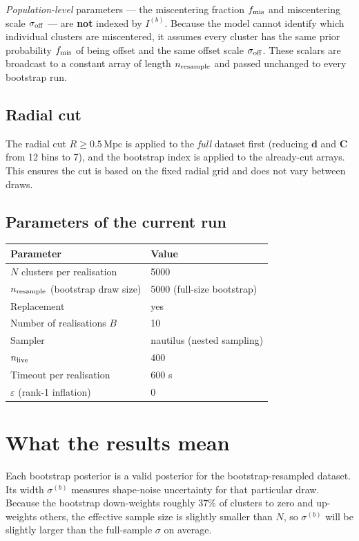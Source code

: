 \documentclass[11pt,a4paper]{article}
\begin{document}
\emph{Population-level} parameters — the miscentering fraction $f_{\rm mis}$
and miscentering scale $\sigma_{\rm off}$ — are \textbf{not} indexed by
$I^{(b)}$.  Because the model cannot identify which individual clusters are
miscentered, it assumes every cluster has the same prior probability
$f_{\rm mis}$ of being offset and the same offset scale $\sigma_{\rm off}$.
These scalars are broadcast to a constant array of length $n_{\rm resample}$
and passed unchanged to every bootstrap run.

\subsection{Radial cut}

The radial cut $R \geq 0.5\,\mathrm{Mpc}$ is applied to the \emph{full}
dataset first (reducing $\mathbf{d}$ and $\mathbf{C}$ from 12 bins to 7),
and the bootstrap index is applied to the already-cut arrays.  This ensures
the cut is based on the fixed radial grid and does not vary between draws.

\subsection{Parameters of the current run}

\begin{center}
\begin{tabular}{ll}
\toprule
Parameter & Value \\
\midrule
$N$ clusters per realisation & 5000 \\
$n_{\rm resample}$ (bootstrap draw size) & 5000 (full-size bootstrap) \\
Replacement & yes \\
Number of realisations $B$ & 10 \\
Sampler & nautilus (nested sampling) \\
$n_{\rm live}$ & 400 \\
Timeout per realisation & 600 s \\
$\varepsilon$ (rank-1 inflation) & 0 \\
\bottomrule
\end{tabular}
\end{center}

\section{What the results mean}

Each bootstrap posterior is a valid posterior for the bootstrap-resampled
dataset.  Its width $\sigma^{(b)}$ measures shape-noise uncertainty for
that particular draw.  Because the bootstrap down-weights roughly $37\%$
of clusters to zero and up-weights others, the effective sample size is
slightly smaller than $N$, so $\sigma^{(b)}$ will be slightly larger than
the full-sample $\sigma$ on average.
\end{document}

